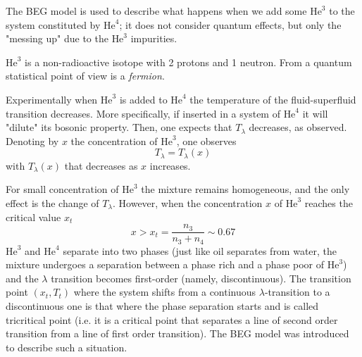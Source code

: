 \documentclass[../main/main.tex]{subfiles}
\begin{document}
 The BEG model is used to describe what happens when we add some \( \text{He}^3 \) to the system constituted by \( \text{He}^4 \); it does not consider quantum effects, but only the "messing up" due to the \( \text{He}^3 \) impurities.
 
 \begin{remark}
  
\( \text{He}^3 \) is a non-radioactive isotope with 2 protons and 1 neutron. From a quantum statistical point of view is a \emph{fermion}.
 \end{remark}

Experimentally when \( \text{He}^3 \)
 is added to \( \text{He}^4 \) the temperature of the fluid-superfluid transition decreases. 
More specifically, if inserted in a system of \( \text{He}^4 \) it will "dilute" its bosonic property. Then, one expects that \( T_ \lambda  \) decreases, as observed. Denoting by \( x \) the concentration of \( \text{He}^3 \),  one observes
\begin{equation*}
  T_{\lambda} = T_ \lambda (x)
\end{equation*}
with \( T_ \lambda (x) \)  that decreases as \( x \) increases.

For small concentration of \( \text{He}^3 \) the mixture remains homogeneous, and the only effect is the change of \( T_ \lambda  \). However, when the concentration \(x\) of \( \text{He}^3 \) reaches the critical value \(x_t\)
\begin{equation*}
  x > x_t = \frac{n_3}{n_3+n_4} \sim 0.67
\end{equation*}
\( \text{He}^3 \) and \( \text{He}^4 \) separate into two phases  (just like oil separates from water, the mixture undergoes a separation between a phase rich and a phase poor of \( \text{He}^3 \))  and the \(\lambda\) transition becomes first-order (namely, discontinuous). The transition point \( (x_t,T_t) \) where the system shifts from a continuous \(\lambda\)-transition to a discontinuous one is that where the phase separation starts and is called tricritical point (i.e. it is a critical point that separates a line of second order transition from a line of first order transition). 
The BEG model was introduced to describe such a situation.
\end{document}
